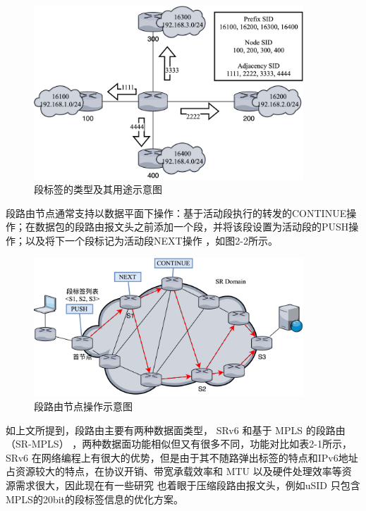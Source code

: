 \begin{figure}[htbp]
\setlength{\abovecaptionskip}{15pt plus 3pt minus 2pt}
\centerline{\includegraphics[width=0.9\textwidth]{./figures/ch2-kinds-of-SID.png}}
\caption{段标签的类型及其用途示意图}
\label{fig-ch2-kinds-of-SID}
\end{figure}

段路由节点通常支持以数据平面下操作：基于活动段执行的转发的CONTINUE操作；在数据包的段路由报文头之前添加一个段，并将该段设置为活动段的PUSH操作；以及将下一个段标记为活动段NEXT操作 \cite{SRARK} ，如图2-2所示。

\begin{figure}[htbp]
\setlength{\abovecaptionskip}{15pt plus 3pt minus 2pt}
\centerline{\includegraphics[width=0.9\textwidth]{./figures/ch2-SR-actions.png}}
\caption{段路由节点操作示意图}
\label{fig-ch2-SR-actions}
\end{figure}

如上文所提到，段路由主要有两种数据面类型， \gls*{SRv6} 和基于 \gls*{MPLS} 的段路由（SR-MPLS）\cite{SRMPLS}  ，两种数据面功能相似但又有很多不同，功能对比如表2-1所示， \gls*{SRv6} 在网络编程上有很大的优势，但是由于其不随路弹出标签的特点和IPv6地址占资源较大的特点，在协议开销、带宽承载效率和 \gls*{MTU} 以及硬件处理效率等资源需求很大，因此现在有一些研究 \cite{GSID, MICROSID, USID} 也着眼于压缩段路由报文头，例如uSID \cite{USID} 只包含MPLS的20bit的段标签信息的优化方案。

